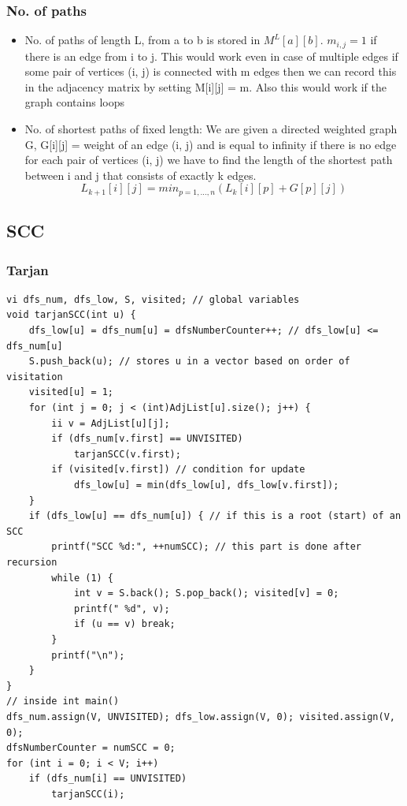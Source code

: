 \documentclass[8pt, a4paper, oneside, twocolumn]{extarticle}
\begin{document}
\subsubsection{No. of paths}
\begin{itemize}
    \item No. of paths of length L, from a to b is stored in $M^L[a][b]$. $m_{i, j} = 1$ if there is an edge from i to j. This would work even in case of multiple edges if some pair of vertices (i, j) is connected with m edges then we can record this in the adjacency matrix by setting M[i][j] = m. Also this would work if the graph contains loops 
    \item No. of shortest paths of fixed length: We are given a directed weighted graph G, G[i][j] = weight of an edge (i, j) and is equal to infinity if there is no edge for each pair of vertices (i, j) we have to find the length of the shortest path between i and j that consists of exactly k edges. $$L_{k + 1}[i][j] = min_{p = 1, \dots, n}(L_k[i][p] + G[p][j])$$
\end{itemize}
\subsection{SCC}
\subsubsection{Tarjan}
\begin{verbatim}
vi dfs_num, dfs_low, S, visited; // global variables
void tarjanSCC(int u) {
    dfs_low[u] = dfs_num[u] = dfsNumberCounter++; // dfs_low[u] <= dfs_num[u]
    S.push_back(u); // stores u in a vector based on order of visitation
    visited[u] = 1;
    for (int j = 0; j < (int)AdjList[u].size(); j++) {
        ii v = AdjList[u][j];
        if (dfs_num[v.first] == UNVISITED)
            tarjanSCC(v.first);
        if (visited[v.first]) // condition for update
            dfs_low[u] = min(dfs_low[u], dfs_low[v.first]); 
    }
    if (dfs_low[u] == dfs_num[u]) { // if this is a root (start) of an SCC
        printf("SCC %d:", ++numSCC); // this part is done after recursion
        while (1) {
            int v = S.back(); S.pop_back(); visited[v] = 0;
            printf(" %d", v);
            if (u == v) break; 
        }
        printf("\n");
    } 
}
// inside int main()
dfs_num.assign(V, UNVISITED); dfs_low.assign(V, 0); visited.assign(V, 0);
dfsNumberCounter = numSCC = 0;
for (int i = 0; i < V; i++)
    if (dfs_num[i] == UNVISITED)
        tarjanSCC(i);
\end{verbatim}
\end{document}
